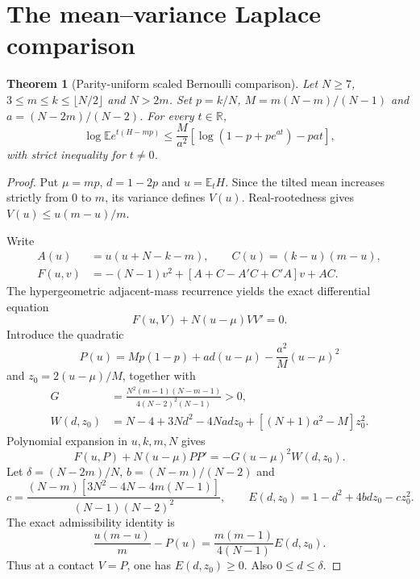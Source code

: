 \documentclass[11pt,a4paper]{article}
\newcommand{\E}{\mathbb E}\newcommand{\R}{\mathbb R}
\newtheorem{theorem}{Theorem}[section]\newtheorem{lemma}[theorem]{Lemma}
\begin{document}
\section{The mean--variance Laplace comparison}
\begin{theorem}[Parity-uniform scaled Bernoulli comparison]\label{thm:lap}
Let $N\ge7$, $3\le m\le k\le\lfloor N/2\rfloor$ and $N>2m$. Set $p=k/N$, $M=m(N-m)/(N-1)$ and $a=(N-2m)/(N-2)$. For every $t\in\R$,
\begin{equation}\label{eq:lap}
 \log\E e^{t(H-mp)}\le\frac M{a^2}\left[\log(1-p+pe^{at})-pat\right],
\end{equation}
with strict inequality for $t\ne0$.
\end{theorem}
\begin{proof}
Put $\mu=mp$, $d=1-2p$ and $u=\E_tH$. Since the tilted mean increases strictly from $0$ to $m$, its variance defines $V(u)$. Real-rootedness gives $V(u)\le u(m-u)/m$.

Write
\begin{align*}
A(u)&=u(u+N-k-m),\qquad C(u)=(k-u)(m-u),\\
F(u,v)&=-(N-1)v^2+[A+C-A'C+C'A]v+AC.
\end{align*}
The hypergeometric adjacent-mass recurrence yields the exact differential equation
\begin{equation}\label{eq:curve}
 F(u,V)+N(u-\mu)VV'=0.
\end{equation}
Introduce the quadratic
\[
 P(u)=Mp(1-p)+ad(u-\mu)-\frac{a^2}{M}(u-\mu)^2
\]
and $z_0=2(u-\mu)/M$, together with
\begin{align*}
G&=\frac{N^2(m-1)(N-m-1)}{4(N-2)^2(N-1)}>0,\\
W(d,z_0)&=N-4+3Nd^2-4Nad z_0+[(N+1)a^2-M]z_0^2.
\end{align*}
Polynomial expansion in $u,k,m,N$ gives
\begin{equation}\label{eq:residual}
 F(u,P)+N(u-\mu)PP'=-G(u-\mu)^2W(d,z_0).
\end{equation}
Let $\delta=(N-2m)/N$, $b=(N-m)/(N-2)$ and
\[
 c=\frac{(N-m)[3N^2-4N-4m(N-1)]}{(N-1)(N-2)^2},\qquad
 E(d,z_0)=1-d^2+4bdz_0-cz_0^2.
\]
The exact admissibility identity is
\begin{equation}\label{eq:admiss}
 \frac{u(m-u)}m-P(u)=\frac{m(m-1)}{4(N-1)}E(d,z_0).
\end{equation}
Thus at a contact $V=P$, one has $E(d,z_0)\ge0$. Also $0\le d\le\delta$.


\end{proof}
\end{document}
